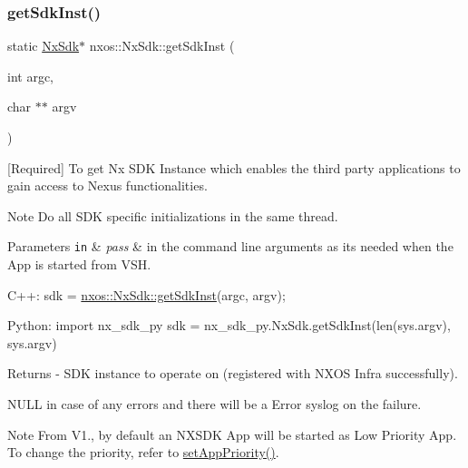 \subsubsection{\texorpdfstring{get\+Sdk\+Inst()}{getSdkInst()}\hspace{0.1cm}{\footnotesize\ttfamily [1/2]}}
{\footnotesize\ttfamily static \mbox{\hyperlink{classnxos_1_1_nx_sdk}{Nx\+Sdk}}$\ast$ nxos\+::\+Nx\+Sdk\+::get\+Sdk\+Inst (\begin{DoxyParamCaption}\item[{int}]{argc,  }\item[{char $\ast$$\ast$}]{argv }\end{DoxyParamCaption})\hspace{0.3cm}{\ttfamily [static]}}

\mbox{[}Required\mbox{]} To get Nx S\+DK Instance which enables the third party applications to gain access to Nexus functionalities. \begin{DoxyNote}{Note}
Do all S\+DK specific initializations in the same thread. 
\end{DoxyNote}

\begin{DoxyParams}[1]{Parameters}
\mbox{\tt in}  & {\em pass} & in the command line arguments as its needed when the App is started from V\+SH.\\
\hline
\end{DoxyParams}

\begin{DoxyCode}
C++:
     sdk = \mbox{\hyperlink{classnxos_1_1_nx_sdk_a5050e2d26c40744b4fc7862068a83f39}{nxos::NxSdk::getSdkInst}}(argc, argv);

Python:
     \textcolor{keyword}{import} nx\_sdk\_py
     sdk = nx\_sdk\_py.NxSdk.getSdkInst(len(sys.argv), sys.argv)
\end{DoxyCode}
 \begin{DoxyReturn}{Returns}
-\/ S\+DK instance to operate on (registered with N\+X\+OS Infra successfully).
\begin{DoxyItemize}
\item N\+U\+LL in case of any errors and there will be a Error syslog on the failure.
\end{DoxyItemize}
\end{DoxyReturn}
\begin{DoxyNote}{Note}
From V1., by default an N\+X\+S\+DK App will be started as Low Priority App. To change the priority, refer to \mbox{\hyperlink{classnxos_1_1_nx_sdk_a46d9487216506aa19e5499759f5eaef7}{set\+App\+Priority()}}. 
\end{DoxyNote}
\mbox{\label{classnxos_1_1_nx_sdk_acdeb12edbd291b5421ddb3260547bf8a}} 
